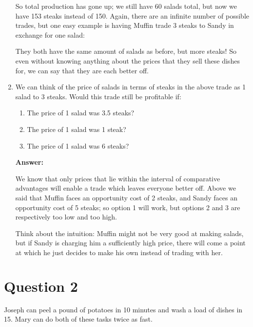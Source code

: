 \documentclass[12pt]{article}
\begin{document}
\begin{enumerate}


So total production has gone up; we still have 60 salads total, but now we have 153 steaks instead of 150. Again, there are an infinite number of possible trades, but one easy example is having Muffin trade 3 steaks to Sandy in exchange for one salad:



They both have the same amount of salads as before, but more steaks! So even without knowing anything about the prices that they sell these dishes for, we can say that they are each better off.

\medskip
\medskip
\medskip

\item We can think of the price of salads in terms of steaks in the above trade as 1 salad to 3 steaks. Would this trade still be profitable if:

\begin{enumerate}
    \item The price of 1 salad was 3.5 steaks?
    \item The price of 1 salad was 1 steak?
    \item The price of 1 salad was 6 steaks?
\end{enumerate}

\textbf{Answer:}

We know that only prices that lie within the interval of comparative advantages will enable a trade which leaves everyone better off. Above we said that Muffin faces an opportunity cost of 2 steaks, and Sandy faces an opportunity cost of 5 steaks; so option 1 will work, but options 2 and 3 are respectively too low and too high.

\medskip

Think about the intuition: Muffin might not be very good at making salads, but if Sandy is charging him a sufficiently high price, there will come a point at which he just decides to make his own instead of trading with her.


\end{enumerate}

\section*{Question 2}
Joseph can peel a pound of potatoes in 10 minutes and wash a load of dishes in 15. Mary can do both of these tasks twice as fast. 

\medskip
\end{document}

